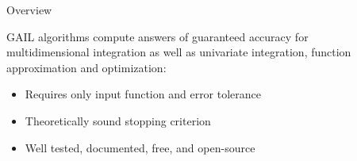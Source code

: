 \documentclass[final]{beamer}
\newlength{\sepwid}
\newlength{\onecolwid}
\begin{document}


\setlength{\belowcaptionskip}{1.ex} %
\setlength{\belowdisplayshortskip}{1.ex} %

\begin{frame}[t] %

\begin{columns}[t] %

\begin{column}{\sepwid}\end{column} %

\begin{column}{\onecolwid} %



\begin{alertblock}{Overview}

GAIL algorithms compute answers of guaranteed accuracy for multidimensional integration as well as univariate integration,  function approximation and optimization:
%
\begin{itemize}
\item Requires only input function and error tolerance 
\item Theoretically sound stopping criterion
\item Well tested, documented, free, and open-source %
\end{itemize}


\end{alertblock}
\end{column}
\end{columns}
\end{frame}
\end{document}
